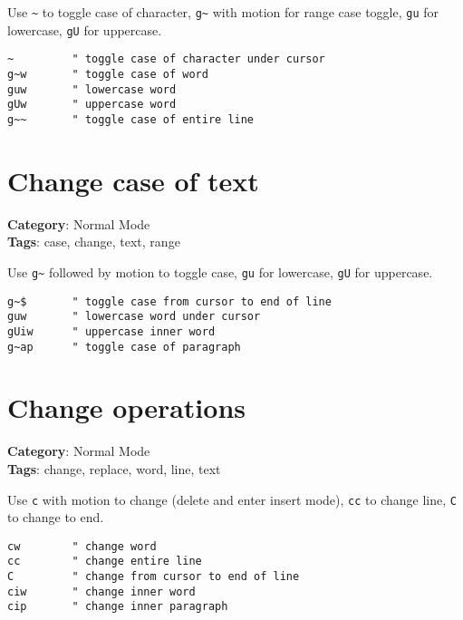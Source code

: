 {{{{{{{{{{Use {\footnotesize \Verb§~§} to toggle case of character, {\footnotesize \Verb§g~§} with motion for range case toggle, {\footnotesize \Verb§gu§} for lowercase, {\footnotesize \Verb§gU§} for uppercase.

\begin{Exa*}{}
\begin{Verbatim}[fontsize=\footnotesize, breaklines, breakanywhere]
~         " toggle case of character under cursor
g~w       " toggle case of word
guw       " lowercase word
gUw       " uppercase word
g~~       " toggle case of entire line
\end{Verbatim}
\end{Exa*}

\section{Change case of text}

\textbf{Category}: Normal Mode\\ \textbf{Tags}: case, change, text, range
\vspace{0.5cm}

Use {\footnotesize \Verb§g~§} followed by motion to toggle case, {\footnotesize \Verb§gu§} for lowercase, {\footnotesize \Verb§gU§} for uppercase.

\begin{Exa*}{}
\begin{Verbatim}[fontsize=\footnotesize, breaklines, breakanywhere]
g~$       " toggle case from cursor to end of line
guw       " lowercase word under cursor
gUiw      " uppercase inner word
g~ap      " toggle case of paragraph
\end{Verbatim}
\end{Exa*}

\section{Change operations}

\textbf{Category}: Normal Mode\\ \textbf{Tags}: change, replace, word, line, text
\vspace{0.5cm}

Use {\footnotesize \Verb§c§} with motion to change (delete and enter insert mode), {\footnotesize \Verb§cc§} to change line, {\footnotesize \Verb§C§} to change to end.

\begin{Exa*}{}
\begin{Verbatim}[fontsize=\footnotesize, breaklines, breakanywhere]
cw        " change word
cc        " change entire line
C         " change from cursor to end of line
ciw       " change inner word
cip       " change inner paragraph
\end{Verbatim}
\end{Exa*}

}}}}}}}}}}
